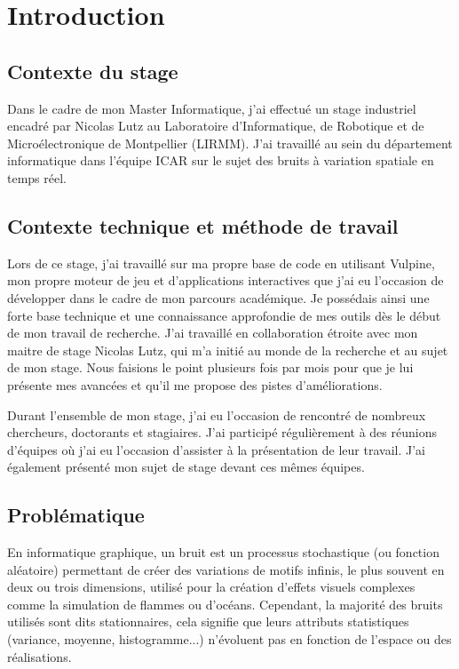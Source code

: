\documentclass{article}
\begin{document}
\clearpage

\tableofcontents

\clearpage

\section{Introduction}

\subsection{Contexte du stage}

Dans le cadre de mon Master Informatique, j'ai effectué un stage industriel
encadré par Nicolas Lutz au Laboratoire d'Informatique, de Robotique et de
Microélectronique de Montpellier (LIRMM). J'ai travaillé au sein du département
informatique dans l'équipe ICAR sur le sujet des bruits à variation spatiale en
temps réel.

\subsection{Contexte technique et méthode de travail}

Lors de ce stage, j'ai travaillé sur ma propre base de code en utilisant
Vulpine, mon propre moteur de jeu et d'applications interactives que j'ai eu
l'occasion de développer dans le cadre de mon parcours académique. Je possédais
ainsi une forte base technique et une connaissance approfondie de mes outils
dès le début de mon travail de recherche. J'ai travaillé en collaboration
étroite avec mon maitre de stage Nicolas Lutz, qui m'a initié au monde de la
recherche et au sujet de mon stage. Nous faisions le point plusieurs fois par
mois pour que je lui présente mes avancées et qu'il me propose des pistes
d'améliorations.

Durant l'ensemble de mon stage, j'ai eu l'occasion de rencontré de nombreux
chercheurs, doctorants et stagiaires. J'ai participé régulièrement à des
réunions d'équipes où j'ai eu l'occasion d'assister à la présentation de leur
travail. J'ai également présenté mon sujet de stage devant ces mêmes équipes.

\subsection{Problématique}

En informatique graphique, un bruit est un processus stochastique (ou fonction
aléatoire) permettant de créer des variations de motifs infinis, le plus
souvent en deux ou trois dimensions, utilisé pour la création d'effets visuels
complexes comme la simulation de flammes ou d'océans. Cependant, la majorité
des bruits utilisés sont dits stationnaires, cela signifie que leurs attributs
statistiques (variance, moyenne, histogramme...) n'évoluent pas en fonction de
l'espace ou des réalisations.
\end{document}
